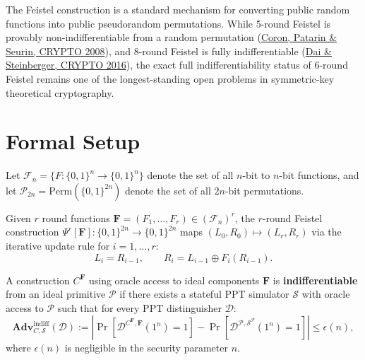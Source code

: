 \documentclass{aicr-conjecture}
\begin{document}

\vspace{0.4em}

The Feistel construction is a standard mechanism for converting public random functions into public pseudorandom permutations. While 5-round Feistel is provably non-indifferentiable from a random permutation (\href{https://eprint.iacr.org/2008/246}{Coron, Patarin \& Seurin, CRYPTO 2008}), and 8-round Feistel is fully indifferentiable (\href{https://eprint.iacr.org/2015/1069}{Dai \& Steinberger, CRYPTO 2016}), the exact full indifferentiability status of 6-round Feistel remains one of the longest-standing open problems in symmetric-key theoretical cryptography.

\section{Formal Setup}

Let $\mathcal{F}_n = \{F : \{0,1\}^n \to \{0,1\}^n\}$ denote the set of all $n$-bit to $n$-bit functions, and let $\mathcal{P}_{2n} = \mathrm{Perm}(\{0,1\}^{2n})$ denote the set of all $2n$-bit permutations.

\begin{definition}
Given $r$ round functions $\mathbf{F} = (F_1, \dots, F_r) \in (\mathcal{F}_n)^r$, the $r$-round Feistel construction $\Psi^r[\mathbf{F}] : \{0,1\}^{2n} \to \{0,1\}^{2n}$ maps $(L_0, R_0) \mapsto (L_r, R_r)$ via the iterative update rule for $i = 1, \dots, r$:
\begin{equation}
L_i = R_{i-1}, \qquad R_i = L_{i-1} \oplus F_i(R_{i-1}).
\end{equation}
\end{definition}

\begin{definition}
A construction $C^{\mathbf{F}}$ using oracle access to ideal components $\mathbf{F}$ is \textbf{indifferentiable} from an ideal primitive $\mathcal{P}$ if there exists a stateful PPT simulator $\mathcal{S}$ with oracle access to $\mathcal{P}$ such that for every PPT distinguisher $\mathcal{D}$:
\begin{equation}
\mathbf{Adv}_{C, \mathcal{S}}^{\mathrm{indiff}}(\mathcal{D}) := \left| \Pr\left[ \mathcal{D}^{C^{\mathbf{F}}, \mathbf{F}}(1^n) = 1 \right] - \Pr\left[ \mathcal{D}^{\mathcal{P}, \mathcal{S}^\mathcal{P}}(1^n) = 1 \right] \right| \le \epsilon(n),
\end{equation}
where $\epsilon(n)$ is negligible in the security parameter $n$.
\end{definition}
\end{document}
